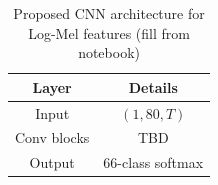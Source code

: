 
\begin{table}[!t]
    \centering
    \caption{Proposed CNN architecture for Log-Mel features (fill from notebook)}
    \scriptsize
    \begin{tabular}{|c|c|}
    \hline
    Layer & Details \\ \hline
    Input & $(1, 80, T)$ \\ \hline
    Conv blocks & TBD \\ \hline
    Output & 66-class softmax \\ \hline
    \end{tabular}
    \label{table:cnn}
\end{table}

